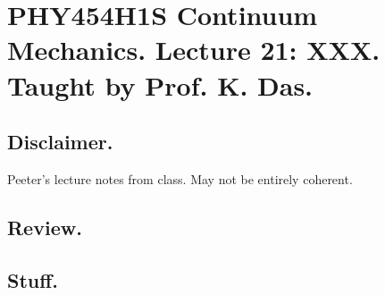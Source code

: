 
%

\chapter{PHY454H1S Continuum Mechanics.  Lecture 21: XXX.  Taught by Prof. K. Das.}
\label{chap:continuumL21}
{}
\date{Mar 29, 2012}

\beginArtWithToc

\section{Disclaimer.}

Peeter's lecture notes from class.  May not be entirely coherent.

\section{Review.}

\section{Stuff.}


\EndNoBibArticle
